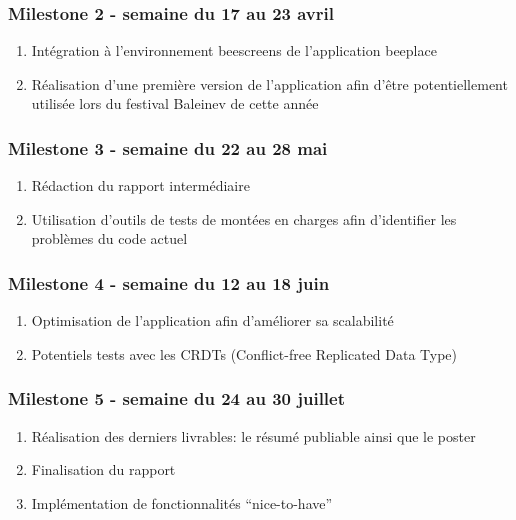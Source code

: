 \subsubsection{Milestone 2 - semaine du 17 au 23 avril}

\begin{enumerate}
  \item Intégration à l'environnement \gls{beescreens} de l'application \gls{beeplace}
  \item Réalisation d'une première version de l'application afin d'être potentiellement utilisée lors du festival Baleinev de cette année
\end{enumerate}

\subsubsection{Milestone 3 - semaine du 22 au 28 mai}
\label{milestone3}

\begin{enumerate}
  \item Rédaction du rapport intermédiaire
  \item Utilisation d'outils de tests de montées en charges afin d'identifier les problèmes du code actuel
\end{enumerate}

\subsubsection{Milestone 4 - semaine du 12 au 18 juin}

\begin{enumerate}
  \item Optimisation de l'application afin d'améliorer sa scalabilité
  \item Potentiels tests avec les CRDTs (Conflict-free Replicated Data Type)
\end{enumerate}

\subsubsection{Milestone 5 - semaine du 24 au 30 juillet}

\begin{enumerate}
  \item Réalisation des derniers livrables: le résumé publiable ainsi que le poster
  \item Finalisation du rapport
  \item Implémentation de fonctionnalités “nice-to-have”
\end{enumerate}

